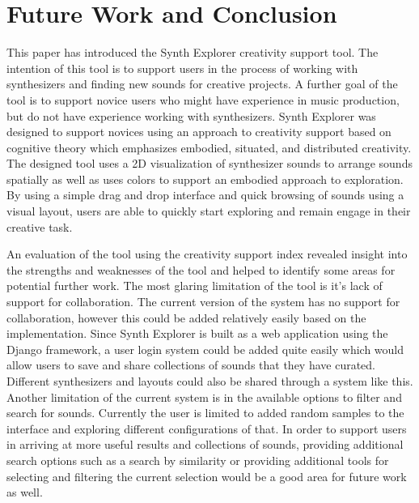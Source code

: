 \section{Future Work and Conclusion}
This paper has introduced the Synth Explorer creativity support tool. The intention of this tool is to support users in the process of working with synthesizers and finding new sounds for creative projects. A further goal of the tool is to support novice users who might have experience in music production, but do not have experience working with synthesizers. Synth Explorer was designed to support novices using an approach to creativity support based on cognitive theory which emphasizes embodied, situated, and distributed creativity. The designed tool uses a 2D visualization of synthesizer sounds to arrange sounds spatially as well as uses colors to support an embodied approach to exploration. By using a simple drag and drop interface and quick browsing of sounds using a visual layout, users are able to quickly start exploring and remain engage in their creative task.

An evaluation of the tool using the creativity support index revealed insight into the strengths and weaknesses of the tool and helped to identify some areas for potential further work. The most glaring limitation of the tool is it's lack of support for collaboration. The current version of the system has no support for collaboration, however this could be added relatively easily based on the implementation. Since Synth Explorer is built as a web application using the Django framework, a user login system could be added quite easily which would allow users to save and share collections of sounds that they have curated. Different synthesizers and layouts could also be shared through a system like this. Another limitation of the current system is in the available options to filter and search for sounds. Currently the user is limited to added random samples to the interface and exploring different configurations of that. In order to support users in arriving at more useful results and collections of sounds, providing additional search options such as a search by similarity or providing additional tools for selecting and filtering the current selection would be a good area for future work as well.